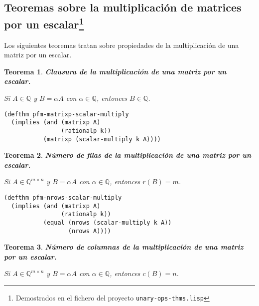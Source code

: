 \documentclass[a4paper,10pt]{article}
\newcommand{\Q}[1]{#1 \in \mathbb{Q}}
\newcommand{\M}[3]{#1 \in \mathbb{Q}^{#2 \times #3}}
\newtheorem{teor}{{Teorema}}
\begin{document}
\vspace{12pt}
\subsection[Teoremas sobre la multiplicación de matrices por un escalar]{Teoremas sobre la multiplicación de matrices por un escalar\footnote{Demostrados en el fichero del proyecto \texttt{unary-ops-thms.lisp}}}
\vspace{10pt}

Los siguientes teoremas tratan sobre propiedades de la multiplicación de una matriz por un escalar.

\par \vspace{16pt}

\begin{teor} \textbf{Clausura de la multiplicación de una matriz por un escalar.}\vspace{8pt}\par
Si $\Q{A}$ y $B=\alpha A$ con $\Q{\alpha}$, entonces $\Q{B}$.
\end{teor}

\begin{lstlisting}[language=clips]
(defthm pfm-matrixp-scalar-multiply
  (implies (and (matrixp A)
                (rationalp k))
           (matrixp (scalar-multiply k A))))
\end{lstlisting}

\par \vspace{16pt}

\begin{teor} \textbf{Número de filas de la multiplicación de una matriz por un escalar.}\vspace{8pt}\par
Si $\M{A}{m}{n}$ y $B=\alpha A$ con $\Q{\alpha}$, entonces $r(B) = m$.
\end{teor}

\begin{lstlisting}[language=clips]
(defthm pfm-nrows-scalar-multiply
  (implies (and (matrixp A)
                (rationalp k))
           (equal (nrows (scalar-multiply k A))
                  (nrows A))))
\end{lstlisting}

\par \vspace{16pt}

\begin{teor} \textbf{Número de columnas de la multiplicación de una matriz por un escalar.}\vspace{8pt}\par
Si $\M{A}{m}{n}$ y $B=\alpha A$ con $\Q{\alpha}$, entonces $c(B) = n$.
\end{teor}
\end{document}
